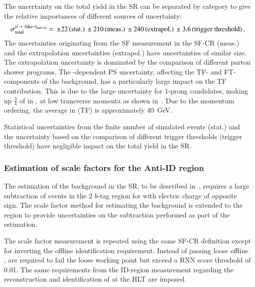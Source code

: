 The uncertainty on the total \ttbarFakes yield in the \hadhad SR can
be separated by category to give the relative importances of different
sources of uncertainty:
\begin{align*}
  \sigma_\text{total}^{\ttbarFakes} = \valuesep\numerrt{22}{stat.}%
  \valuesep\numerrt{210}{meas.}%
  \valuesep\numerrt{240}{extrapol.}%
  \valuesep\numerrt{3.6}{trigger threshold} \,\text{.}
\end{align*}
The uncertainties originating from the SF measurement in the SF-CR
(meas.) and the extrapolation uncertainties (extrapol.) have
uncertainties of similar size. The extrapolation uncertainty is
dominated by the comparison of different parton shower programs. The
\faketauhadvis \pT-dependent PS uncertainty, affecting the TF- and
FT-components of the background, has a particularly large impact on
the TF contribution. This is due to the large uncertainty for 1-prong
\faketauhadvis candidates, making up $\frac{3}{4}$ of \faketauhadvis
in \ttbar, at low transverse momenta as shown
in~. Due to the momentum ordering,
the average \faketauhadvis \pT in \ttbarFakes (TF) is approximately
\SI{40}{\GeV}.

Statistical uncertainties from the finite number of simulated events
(stat.) and the uncertainty based on the comparison of different
trigger thresholds (trigger threshold) have negligible impact on the
total yield in the \hadhad SR.




\subsubsection{Estimation of \faketauhadvis scale factors for the
  Anti-ID region}

The estimation of the \multijet background in the \hadhad SR, to be
described in~, requires a large subtraction of
\ttbarFakes events in the 2 $b$-tag \antiid region for \tauhadvis with
electric charge of opposite sign. The scale factor method for
estimating the \ttbarFakes background is extended to the \antiid
region to provide uncertainties on the subtraction performed as part
of the \multijet estimation.

The scale factor measurement is repeated using the same SF-CR
definition except for inverting the offline \tauhadvis identification
requirement. Instead of \tauhadvis passing loose offline \tauid,
\tauhadvis are required to fail the loose working point but exceed a
RNN \tauid score threshold of \num{0.01}. The same requirements from
the ID-region measurement regarding the reconstruction and
identification of \tauhadvis at the HLT are imposed.


